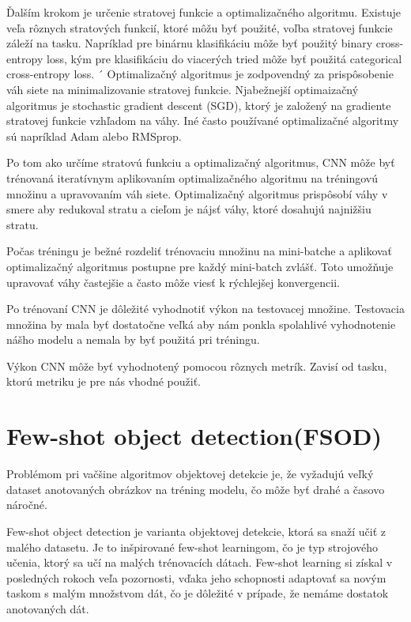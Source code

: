 Ďalším krokom je určenie stratovej funkcie a optimalizačného algoritmu. Existuje veľa rôznych stratových funkcií, ktoré môžu byť použité, voľba stratovej funkcie záleží na tasku. Napríklad pre binárnu klasifikáciu môže byť použitý binary cross-entropy loss, kým pre klasifikáciu do viacerých tried môže byť použitá categorical cross-entropy loss. 
´
Optimalizačný algoritmus je zodpovendný za prispôsobenie váh siete na minimalizovanie stratovej funkcie. Njabežnejší optimaizačný algoritmus je stochastic gradient descent (SGD), ktorý je založený na gradiente stratovej funkcie vzhľadom na váhy. Iné často používané optimalizačné algoritmy sú napríklad Adam alebo RMSprop. 

Po tom ako určíme stratovú funkciu a optimalizačný algoritmus, CNN môže byť trénovaná iteratívnym aplikovaním optimalizačného algoritmu na tréningovú množinu a upravovaním váh siete. Optimalizačný algoritmus prispôsobí váhy v smere aby redukoval stratu a cieľom je nájsť váhy, ktoré dosahujú najnižšiu stratu. 

Počas tréningu je bežné rozdeliť trénovaciu množinu na mini-batche a aplikovať optimalizačný algoritmus postupne pre každý mini-batch zvlášť. Toto umožňuje upravovať váhy častejšie a často môže viesť k rýchlejšej konvergencii. 

Po trénovaní CNN je dôležité vyhodnotiť výkon na testovacej množine. Testovacia množina by mala byť dostatočne veľká aby nám ponkla spolahlivé vyhodnotenie nášho modelu a nemala by byť použitá pri tréningu. 

Výkon CNN môže byť vyhodnotený pomocou rôznych metrík. Zavisí od tasku, ktorú metriku je pre nás vhodné použiť.

\section{Few-shot object detection(FSOD)}
\hspace{\parindent}Problémom pri vačšine algoritmov objektovej detekcie je, že vyžadujú veľký dataset anotovaných obrázkov na tréning modelu, čo môže byť drahé a časovo náročné. 

Few-shot object detection je varianta objektovej detekcie, ktorá sa snaží učiť z malého datasetu. Je to inšpirované few-shot learningom, čo je typ strojového učenia, ktorý sa učí na malých trénovacích dátach. Few-shot learning si získal v posledných rokoch veľa pozornosti, vďaka jeho schopnosti adaptovať sa novým taskom s malým množstvom dát, čo je dôležité v prípade, že nemáme dostatok anotovaných dát. 

